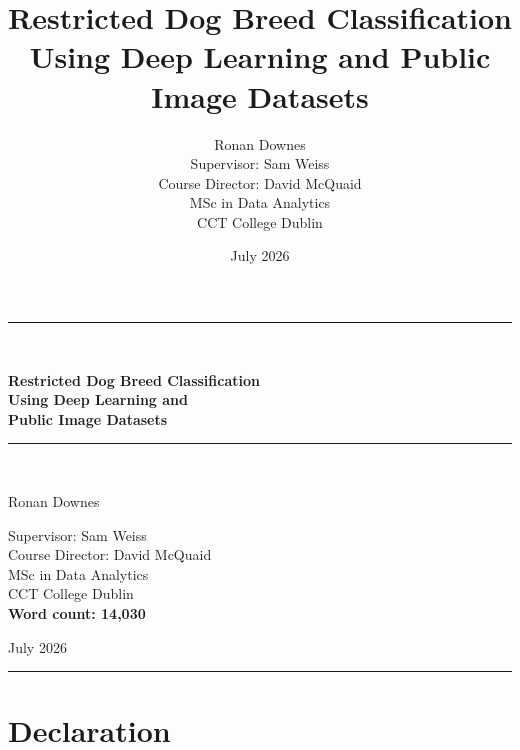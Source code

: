 \documentclass[12pt,a4paper]{report}
\title{
  Restricted Dog Breed Classification Using Deep Learning
  and Public Image Datasets
}
\author{
  Ronan Downes\\[1cm]
  Supervisor: Sam Weiss\\
  Course Director: David McQuaid\\[1cm]
  MSc in Data Analytics\\
  CCT College Dublin
}
\date{July 2026}
\begin{document}

\begin{titlepage}
  \thispagestyle{empty}
  \centering

  \vspace*{1.2cm}
  {\color{projectblue}\rule{\textwidth}{2.2pt}}\\[1.3cm]

  {\sffamily\bfseries\color{projectblue}\fontsize{29}{34}\selectfont
   Restricted Dog Breed Classification\\[0.25em]
   Using Deep Learning and\\[0.25em]
   Public Image Datasets\par}

  \vspace{0.8cm}
  {\color{lightblue}\rule{0.72\textwidth}{1.1pt}}\\[1.15cm]

  {\Large\sffamily Ronan Downes\par}

  \vfill

\begin{minipage}{0.72\textwidth}
  \centering
  {\large\sffamily
    Supervisor: Sam Weiss\\[0.35em]
    Course Director: David McQuaid\\[1.1em]
    MSc in Data Analytics\\
    CCT College Dublin\\[1.1em]
    \textbf{Word count: 14,030}
  }
\end{minipage}
  \vfill

  {\large\sffamily\color{projectblue}July 2026\par}
  \vspace{0.8cm}
  {\color{projectblue}\rule{\textwidth}{2.2pt}}
\end{titlepage}




\chapter*{Declaration}
\end{document}

